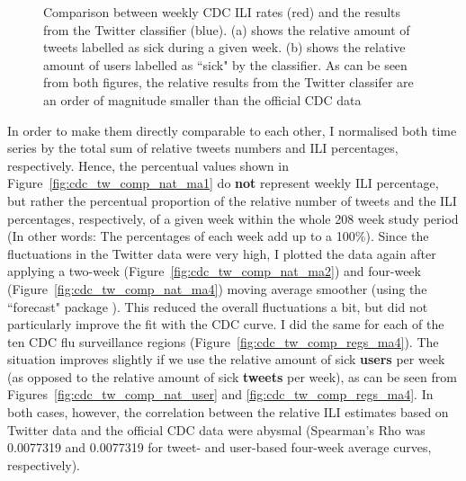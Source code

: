 \documentclass[11pt, a4paper]{report}\usepackage[]{graphicx}\usepackage[]{color}
\begin{document}
\begin{figure}[H]
\begin{subfigure}[t]{0.49\textwidth}
  \caption{}
  \end{subfigure}
  \caption{Comparison between weekly CDC ILI rates (red) and the results from the Twitter classifier (blue). (a) shows the relative amount of tweets labelled as sick during a given week. (b) shows the relative amount of users labelled as ``sick" by the classifier. As can be seen from both figures, the relative results from the Twitter classifer are an order of magnitude smaller than the official CDC data}
  \label{fig:naive_comparison_CDC_twitter}
\end{figure}

In order to make them directly comparable to each other, I normalised both time series by the total sum of relative tweets numbers and ILI percentages, respectively. Hence, the percentual values shown in Figure~\ref{fig:cdc_tw_comp_nat_ma1} do \textbf{not} represent weekly ILI percentage, but rather the percentual proportion of the relative number of tweets and the ILI percentages, respectively, of a given week within the whole 208 week study period (In other words: The percentages of each week add up to a 100\%). Since the fluctuations in the Twitter data were very high, I plotted the data again after applying a two-week (Figure~\ref{fig:cdc_tw_comp_nat_ma2}) and four-week (Figure~\ref{fig:cdc_tw_comp_nat_ma4}) moving average smoother (using the ``forecast" package ). This reduced the overall fluctuations a bit, but did not particularly improve the fit with the CDC curve. I did the same for each of the ten CDC flu surveillance regions (Figure~\ref{fig:cdc_tw_comp_regs_ma4}). The situation improves slightly if we use the relative amount of sick \textbf{users} per week (as opposed to the relative amount of sick \textbf{tweets} per week), as can be seen  from Figures~\ref{fig:cdc_tw_comp_nat_user} and \ref{fig:cdc_tw_comp_regs_ma4}. In both cases, however, the correlation between the relative ILI estimates based on Twitter data and the official CDC data were abysmal (Spearman's Rho was 0.0077319 and 0.0077319 for tweet- and user-based four-week average curves, respectively).\newline 
\end{document}
